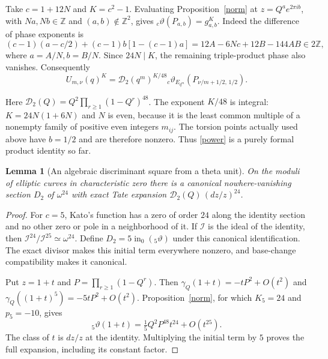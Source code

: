 \documentclass[11pt]{article}
\newtheorem{lemma}[theorem]{Lemma}
\theoremstyle{remark}\newtheorem{remark}[theorem]{Remark}
\newcommand{\Z}{\mathbb Z}\newcommand{\Q}{\mathbb Q}
\begin{document}
Take $c=1+12N$ and $K=c^2-1$. Evaluating Proposition~\ref{norm} at
$z=Q^ae^{2\pi ib}$, with $Na,Nb\in\Z$ and
$(a,b)\notin\Z^2$, gives
${}_c\vartheta(P_{a,b})=g_{a,b}^K$.
Indeed the difference of phase exponents is
\[
 (c-1)(a-c/2)+(c-1)b[1-(c-1)a]
 =12A-6Nc+12B-144AB\in2\Z,
\]
where $a=A/N,b=B/N$. Since $24N\mid K$, the remaining triple-product
phase also vanishes. Consequently
\begin{equation}\label{power}
 U_{m,\nu}(q)^K=\mathcal D_2(q^m)^{K/48}
       {}_c\vartheta_{E_{q^m}}(P_{\nu/m+1/2,\,1/2}).
\end{equation}

Here $\mathcal D_2(Q)=Q^2\prod_{r\geq1}(1-Q^r)^{48}$.
The exponent $K/48$ is integral: $K=24N(1+6N)$ and $N$ is even,
because it is the least common multiple of a nonempty family of positive
even integers $m_{ij}$. The torsion points actually used above have
$b=1/2$ and are therefore nonzero.
Thus \eqref{power} is a purely formal product identity so far.

\begin{lemma}[An algebraic discriminant square from a theta unit]\label{d2}
On the moduli of elliptic curves in characteristic zero there is a
canonical nowhere-vanishing section $D_2$ of $\omega^{24}$ with exact
Tate expansion $\mathcal D_2(Q)\,(dz/z)^{24}$.
\end{lemma}
\begin{proof}
For $c=5$, Kato's function has a zero of order $24$ along the identity
section and no other zero or pole in a neighborhood of it. If $\mathcal I$
is the ideal of the identity, then
$\mathcal I^{24}/\mathcal I^{25}\simeq\omega^{24}$.
Define $D_2=5\operatorname{in}_0({}_5\vartheta)$ under this canonical
identification. The exact divisor makes this initial term everywhere
nonzero, and base-change compatibility makes it canonical.

Put $z=1+t$ and $P=\prod_{r\geq1}(1-Q^r)$. Then
$\gamma_Q(1+t)=-tP^2+O(t^2)$ and
$\gamma_Q((1+t)^5)=-5tP^2+O(t^2)$.
Proposition~\ref{norm}, for which $K_5=24$ and $p_5=-10$, gives
\[
 {}_5\vartheta(1+t)=\tfrac15 Q^2P^{48}t^{24}+O(t^{25}).
\]
The class of $t$ is $dz/z$ at the identity. Multiplying the initial term
by $5$ proves the full expansion, including its constant factor.
\end{proof}
\end{document}
